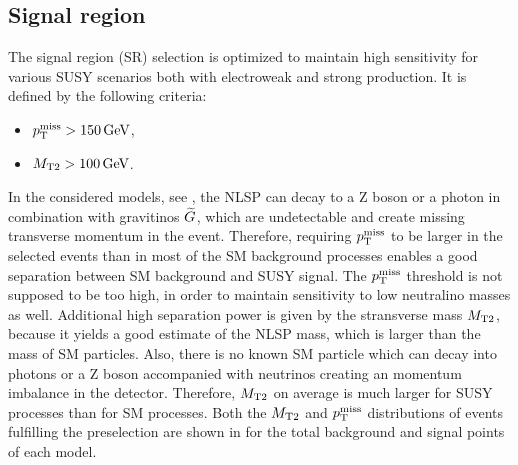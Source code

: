 \subsection{Signal region}\label{sec:SRSelection}
The signal region (SR) selection is optimized to maintain high sensitivity for various SUSY scenarios both with electroweak and strong production.
It is defined by the following criteria:
\begin{itemize}
 \item $p_{\mathrm{T}}^\text{miss}>150\,\text{Ge\hspace{-.08em}V}$,
 \item $M_{\mathrm{T2}}>100\,\text{Ge\hspace{-.08em}V}$.
\end{itemize}
In the considered models, see , the NLSP can decay to a Z boson or a photon in combination with gravitinos $\widetilde{G}$, which are undetectable and create missing transverse momentum in the event. Therefore, requiring $p_{\mathrm{T}}^\text{miss}$ to be larger in the selected events than in most of the SM background processes enables a good separation between SM background and SUSY signal. The $p_{\mathrm{T}}^\text{miss}$ threshold is not supposed to be too high, in order to maintain sensitivity to low neutralino masses as well.
Additional high separation power is given by the stransverse mass $M_{\mathrm{T2}}$, because it yields a good estimate of the NLSP mass, which is larger than the mass of SM particles. Also, there is no known SM particle which can decay into photons or a Z boson accompanied with neutrinos creating an momentum imbalance in the detector. Therefore, $M_{\mathrm{T2}}$ on average is much larger for SUSY processes than for SM processes. Both the $M_{\mathrm{T2}}$ and $p_{\mathrm{T}}^\text{miss}$ distributions of events fulfilling the preselection are shown in  for the total background and signal points of each model.
